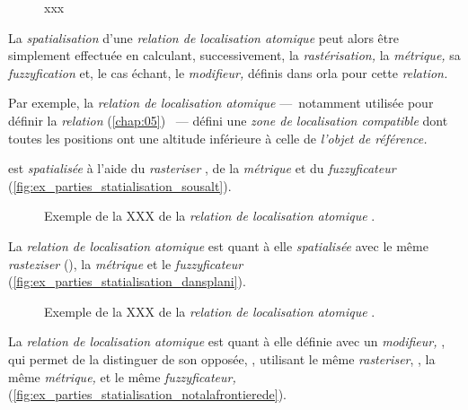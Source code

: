 \begin{figure}
  \centering
  
  \caption{xxx}
  \label{fig:structure_spatialisation_ontologie}
\end{figure}

La \emph{spatialisation} d'une \emph{relation de localisation
  atomique} peut alors être simplement effectuée en calculant,
successivement, la \emph{rastérisation,} la \emph{métrique,} sa
\emph{fuzzyfication} et, le cas échant, le \emph{modifieur,} définis
dans \ac{orla} pour cette \emph{relation.}

Par exemple, la \emph{relation de localisation atomique}
 ---~notamment utilisée pour définir
la \emph{relation}  (\autoref{chap:05})
~--- défini une \emph{zone de localisation compatible} dont
toutes les positions ont une altitude inférieure à celle de \emph{l'objet de référence.}


est \emph{spatialisée} à l'aide du \emph{rasteriser}
, de la \emph{métrique}
 et du \emph{fuzzyficateur}
(\autoref{fig:ex_parties_statialisation_sousalt}).

\begin{figure}
  \centering
  
  \caption{Exemple de la XXX de la \emph{relation de localisation
      atomique} \protect{}.}
  \label{fig:ex_parties_statialisation_sousalt}
\end{figure}

La \emph{relation de localisation atomique}  est quant à elle \emph{spatialisée} avec le même \emph{rasteziser} (), la \emph{métrique}  et le \emph{fuzzyficateur}  (\autoref{fig:ex_parties_statialisation_dansplani}).

\begin{figure}
  \centering
  
  \caption{Exemple de la XXX de la \emph{relation de localisation
      atomique} \protect{}.}
  \label{fig:ex_parties_statialisation_dansplani}
\end{figure}

La \emph{relation de localisation atomique}  est quant à elle définie avec un \emph{modifieur,} , qui permet de la distinguer de son opposée, , utilisant le même \emph{rasteriser}, , la même \emph{métrique,}  et le même \emph{fuzzyficateur,}  (\autoref{fig:ex_parties_statialisation_notalafrontierede}).

